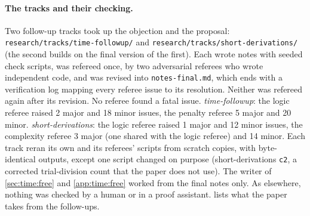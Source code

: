 \paragraph{The tracks and their checking.} Two follow-up tracks took up the objection and the proposal: \texttt{research/tracks/time-followup/} and \texttt{research/tracks/short-derivations/} (the second builds on the final version of the first). Each wrote notes with seeded check scripts, was refereed once, by two adversarial referees who wrote independent code, and was revised into \texttt{notes-final.md}, which ends with a verification log mapping every referee issue to its resolution. Neither was refereed again after its revision. No referee found a fatal issue. \emph{time-followup}: the logic referee raised 2 major and 18 minor issues, the penalty referee 5 major and 20 minor. \emph{short-derivations}: the logic referee raised 1 major and 12 minor issues, the complexity referee 3 major (one shared with the logic referee) and 14 minor. Each track reran its own and its referees' scripts from scratch copies, with byte-identical outputs, except one script changed on purpose (short-derivations \texttt{c2}, a corrected trial-division count that the paper does not use). The writer of \cref{sec:time:free} and \cref{app:time:free} worked from the final notes only. As elsewhere, nothing was checked by a human or in a proof assistant.  lists what the paper takes from the follow-ups.

